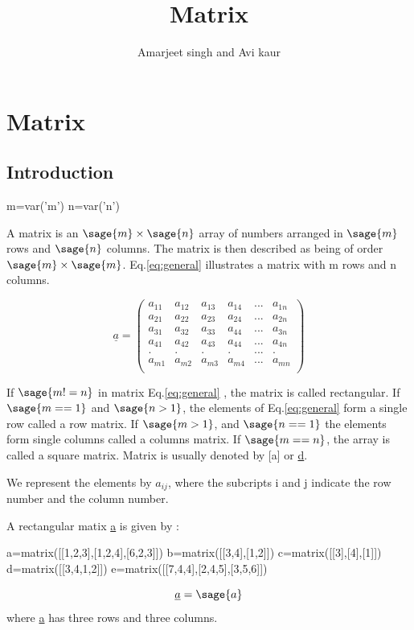 \documentclass[12pt]{report}
\title{\textbf{Matrix}}
\author{Amarjeet singh and Avi kaur}
\newcommand{\lab}[1]{
Eq.\ref{#1}
}
\begin{document}
\begin{titlepage}
\maketitle
\end{titlepage}
\chapter{Matrix}
\section{Introduction}
\begin{sagesilent}
m=var('m')
n=var('n')
\end{sagesilent}

A matrix is an $\sage{m} \times \sage{n}$  array of numbers arranged in $\sage{m}$ rows and $\sage{n}$ columns. The matrix is then described as being of order $\sage{m} \times \sage{m}$. \lab{eq:general} illustrates a matrix with m rows and n columns.


\begin{equation}
\underline{a}=\left(\begin{array}{rrrrrr}
a_{11} & a_{12} & a_{13} & a_{14} & ... & a_{1n} \\
a_{21} & a_{22} & a_{23} & a_{24} & ... & a_{2n} \\
a_{31} & a_{32} & a_{33} & a_{44} & ... & a_{3n} \\
a_{41} & a_{42} & a_{43} & a_{44} & ... & a_{4n} \\
.     & .     & .     & .     & ... & .     \\
a_{m1} & a_{m2} & a_{m3} & a_{m4} & ... & a_{mn} \\
\end{array}\right) \label{eq:general}          
\end{equation}


If $\sage{m!=n}$ in matrix \lab{eq:general}, the matrix is called rectangular. If $\sage{m==1}$ and $\sage{n>1}$, the elements of \lab{eq:general} form a single row called a row matrix. If $\sage{m>1}$, and $\sage{n==1}$ the elements form single columns called a columns matrix. If $\sage{m==n}$, the array is called a square matrix.
Matrix is usually denoted by [a] or \underline{d}.

We represent the elements by $a_{{ij}}$, where the subcripts i and j indicate the row number and the column number.

A rectangular matix \underline{a} is given by : 
\begin{sagesilent}
a=matrix([[1,2,3],[1,2,4],[6,2,3]])
b=matrix([[3,4],[1,2]])
c=matrix([[3],[4],[1]])
d=matrix([[3,4,1,2]])
e=matrix([[7,4,4],[2,4,5],[3,5,6]])
\end{sagesilent}
\begin{equation}
\underline{a}=\sage{a}
\label{eq:rectangle}
\end{equation}
where \underline{a} has three rows and three columns.
\end{document}
